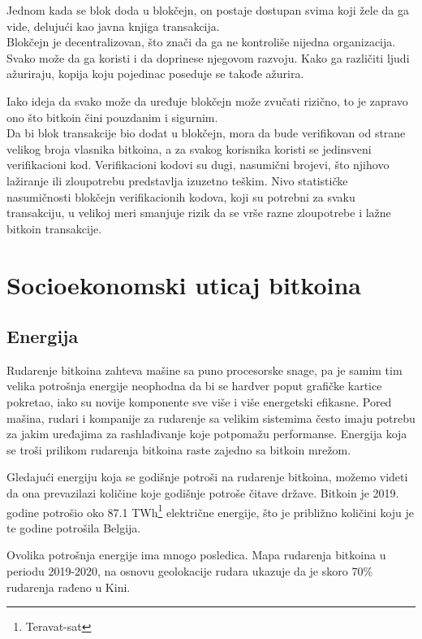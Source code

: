 \documentclass[a4paper]{article}
\begin{document}
Jednom kada se blok doda u blokčejn, on postaje dostupan svima koji žele da ga vide, delujući kao javna knjiga transakcija.
\\
Blokčejn je decentralizovan, što znači da ga ne kontroliše nijedna organizacija. Svako može da ga koristi i da doprinese njegovom razvoju. Kako ga različiti ljudi ažuriraju, kopija koju pojedinac poseduje se takođe ažurira.

Iako ideja da svako može da uređuje blokčejn može zvučati rizično, to je zapravo ono što bitkoin čini pouzdanim i sigurnim.
\\
Da bi blok transakcije bio dodat u blokčejn, mora da bude verifikovan od strane velikog broja vlasnika bitkoina, a za svakog korisnika koristi se jedinsveni verifikacioni kod.\cite{verifikacija}
Verifikacioni kodovi su dugi, nasumični brojevi, što njihovo lažiranje ili zloupotrebu predstavlja izuzetno teškim. Nivo statističke nasumičnosti blokčejn verifikacionih kodova, koji su potrebni za svaku transakciju, u velikoj meri smanjuje rizik da se vrše razne zloupotrebe i lažne bitkoin transakcije.

\section{Socioekonomski uticaj bitkoina}

\subsection{Energija}

Rudarenje bitkoina zahteva mašine sa puno procesorske snage, pa je samim tim velika potrošnja energije neophodna da bi se hardver poput grafičke kartice pokretao, iako su novije komponente sve više i više energetski efikasne. Pored mašina, rudari i kompanije za rudarenje sa velikim sistemima često imaju potrebu za jakim uređajima za rashlađivanje koje potpomažu performanse. Energija koja se troši prilikom rudarenja bitkoina raste zajedno sa bitkoin mrežom.

Gledajući energiju koja se godišnje potroši na rudarenje bitkoina, možemo videti da ona prevazilazi količine koje godišnje potroše čitave države. Bitkoin je 2019. godine potrošio oko 87.1 TWh\footnote{Teravat-sat} električne energije, što je približno količini koju je te godine potrošila Belgija.  \cite{energijapotrosnja}


Ovolika potrošnja energije ima mnogo posledica. Mapa rudarenja bitkoina u periodu 2019-2020, na osnovu geolokacije rudara ukazuje da je skoro 70\% rudarenja rađeno u Kini. \cite{energijakina}
\end{document}
